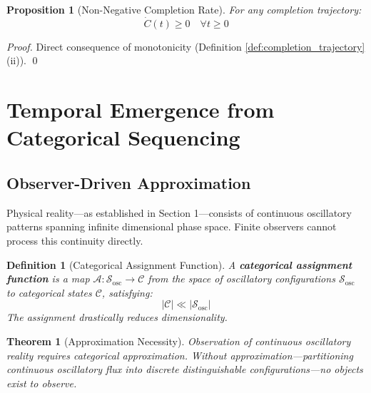 \documentclass[12pt,a4paper]{article}
\newtheorem{theorem}{Theorem}
\newtheorem{definition}{Definition}
\newtheorem{proposition}{Proposition}
\begin{document}
\begin{proposition}[Non-Negative Completion Rate]
\label{prop:nonnegative_rate}
For any completion trajectory:
\begin{equation}
\dot{C}(t) \geq 0 \quad \forall t \geq 0
\end{equation}
\end{proposition}

\begin{proof}
Direct consequence of monotonicity (Definition \ref{def:completion_trajectory}(ii)). \qed
\end{proof}

\section{Temporal Emergence from Categorical Sequencing}

\subsection{Observer-Driven Approximation}

Physical reality—as established in Section 1—consists of continuous oscillatory patterns spanning infinite dimensional phase space. Finite observers cannot process this continuity directly.

\begin{definition}[Categorical Assignment Function]
\label{def:categorical_assignment}
A \textbf{categorical assignment function} is a map $\mathcal{A}: \mathcal{S}_{\text{osc}} \to \mathcal{C}$ from the space of oscillatory configurations $\mathcal{S}_{\text{osc}}$ to categorical states $\mathcal{C}$, satisfying:
\begin{equation}
|\mathcal{C}| \ll |\mathcal{S}_{\text{osc}}|
\end{equation}
The assignment drastically reduces dimensionality.
\end{definition}

\begin{theorem}[Approximation Necessity]
\label{thm:approximation_necessity}
Observation of continuous oscillatory reality requires categorical approximation. Without approximation—partitioning continuous oscillatory flux into discrete distinguishable configurations—no objects exist to observe.
\end{theorem}
\end{document}
